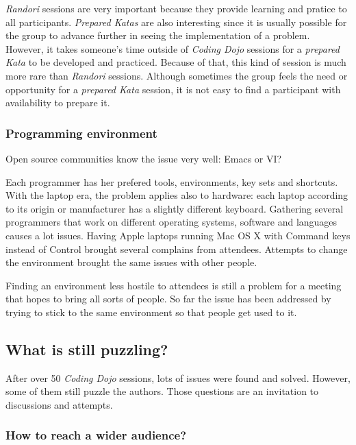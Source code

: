 \textsl{Randori} sessions are very important because they provide
learning and pratice to all participants. \textsl{Prepared Katas} are
also interesting since it is usually possible for the group to advance
further in seeing the implementation of a problem. However, it takes
someone's time outside of \textsl{Coding Dojo} sessions for a
\textsl{prepared Kata} to be developed and practiced. Because of that,
this kind of session is much more rare than \textsl{Randori} sessions.
Although sometimes the group feels the need or opportunity for a
\textsl{prepared Kata} session, it is not easy to find a participant
with availability to prepare it.

\subsubsection{Programming environment}

Open source communities know the issue very well: Emacs or VI?

Each programmer has her prefered tools, environments, key sets and
shortcuts. With the laptop era, the problem applies also to hardware:
each laptop according to its origin or manufacturer has a slightly
different keyboard. Gathering several programmers that work on
different operating systems, software and languages causes a lot
issues. Having Apple laptops running Mac OS X with Command keys
instead of Control brought several complains from attendees. Attempts
to change the environment brought the same issues with other people.

Finding an environment less hostile to attendees is still a problem
for a meeting that hopes to bring all sorts of people. So far the
issue has been addressed by trying to stick to the same environment so
that people get used to it.

\subsection{What is still puzzling?}\label{ssub:puzzles}

After over 50 \textit{Coding Dojo} sessions, lots of issues were found
and solved. However, some of them still puzzle the authors. Those
questions are an invitation to discussions and attempts.

\subsubsection{How to reach a wider audience?}

